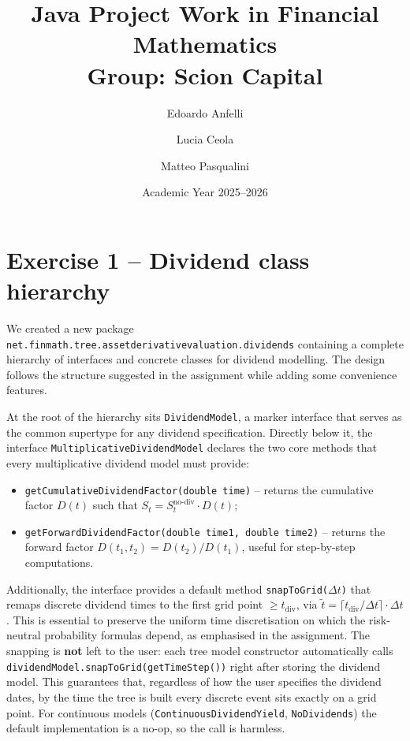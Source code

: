 \documentclass[11pt,a4paper]{article}
\title{\textbf{Java Project Work in Financial Mathematics}\\[4pt]
\large Group: Scion Capital}
\author{Edoardo Anfelli \and Lucia Ceola \and Matteo Pasqualini}
\date{Academic Year 2025--2026}
\begin{document}
\maketitle

\section{Exercise 1 -- Dividend class hierarchy}

We created a new package \texttt{net.finmath.tree.assetderivativevaluation.dividends} containing a complete hierarchy of interfaces and concrete classes for dividend modelling. The design follows the structure suggested in the assignment while adding some convenience features.

At the root of the hierarchy sits \texttt{DividendModel}, a marker interface that serves as the common supertype for any dividend specification. Directly below it, the interface \texttt{MultiplicativeDividendModel} declares the two core methods that every multiplicative dividend model must provide:
\begin{itemize}[nosep]
  \item \texttt{getCumulativeDividendFactor(double time)} -- returns the cumulative factor $D(t)$ such that $S_t = S_t^{\text{no-div}} \cdot D(t)$;
  \item \texttt{getForwardDividendFactor(double time1, double time2)} -- returns the forward factor $D(t_1, t_2) = D(t_2)/D(t_1)$, useful for step-by-step computations.
\end{itemize}
Additionally, the interface provides a default method \texttt{snapToGrid($\Delta t$)} that remaps discrete dividend times to the first grid point $\geq t_{\text{div}}$, via $\tilde{t} = \lceil t_{\text{div}} / \Delta t \rceil \cdot \Delta t$.  This is essential to preserve the uniform time discretisation on which the risk-neutral probability formulas depend, as emphasised in the assignment.  The snapping is \textbf{not} left to the user: each tree model constructor automatically calls \texttt{dividendModel.snapToGrid(getTimeStep())} right after storing the dividend model.  This guarantees that, regardless of how the user specifies the dividend dates, by the time the tree is built every discrete event sits exactly on a grid point.  For continuous models (\texttt{ContinuousDividendYield}, \texttt{NoDividends}) the default implementation is a no-op, so the call is harmless.
\end{document}
